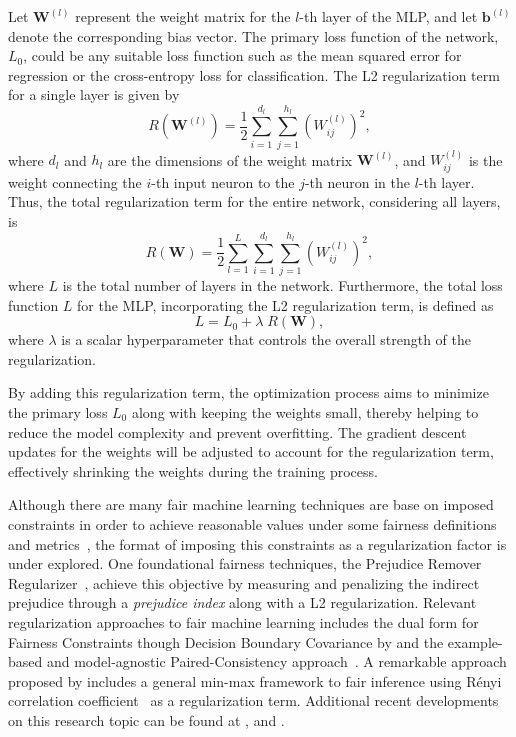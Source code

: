 Let $\mathbf{W}^{(l)}$ represent the weight matrix for the $l$-th layer of the MLP, and let $\mathbf{b}^{(l)}$ denote the corresponding bias vector. The primary loss function of the network, $L_0$, could be any suitable loss function such as the mean squared error for regression or the cross-entropy loss for classification. The L2 regularization term for a single layer is given by
\begin{equation}
R(\mathbf{W}^{(l)}) = \frac{1}{2} \sum_{i=1}^{d_l} \sum_{j=1}^{h_l} \left( W^{(l)}_{ij} \right)^2,
\end{equation}
where $d_l$ and $h_l$ are the dimensions of the weight matrix $\mathbf{W}^{(l)}$, and $W^{(l)}_{ij}$ is the weight connecting the $i$-th input neuron to the $j$-th neuron in the $l$-th layer. Thus, the total regularization term for the entire network, considering all layers, is
\begin{equation}
R(\mathbf{W}) = \frac{1}{2} \sum_{l=1}^{L} \sum_{i=1}^{d_l} \sum_{j=1}^{h_l} \left( W^{(l)}_{ij} \right)^2,
\end{equation}
where $L$ is the total number of layers in the network. Furthermore, the total loss function $L$ for the MLP, incorporating the L2 regularization term, is defined as
\begin{equation}
L = L_0 + \lambda \; R(\mathbf{W}),
\end{equation}
where $\lambda$ is a scalar hyperparameter that controls the overall strength of the regularization.

By adding this regularization term, the optimization process aims to minimize the primary loss $L_0$ along with keeping the weights small, thereby helping to reduce the model complexity and prevent overfitting. The gradient descent updates for the weights will be adjusted to account for the regularization term, effectively shrinking the weights during the training process.

Although there are many fair machine learning techniques are base on imposed constraints in order to achieve reasonable values under some fairness definitions and metrics~\citep{Mehrabi2019,caton2023,Hort2023}, the format of imposing this constraints as a regularization factor is under explored. One foundational fairness techniques, the Prejudice Remover Regularizer~\citep{Kamishima2012}, achieve this objective by measuring and penalizing the indirect prejudice through a \textit{prejudice index} along with a L2 regularization. Relevant regularization approaches to fair machine learning includes the dual form for Fairness Constraints though Decision Boundary Covariance by \cite{Zafar2017b} and the example-based and model-agnostic Paired-Consistency approach~\citep{Horesh2020}. A remarkable approach proposed by \cite{Baharlouei2020} includes a general min-max framework to fair inference using Rényi correlation coefficient~\citep{Renyi1959} as a regularization term. Additional recent developments on this research topic can be found at \cite{Olfat2020}, \cite{Yu2022} and \citep{jung2023}.


